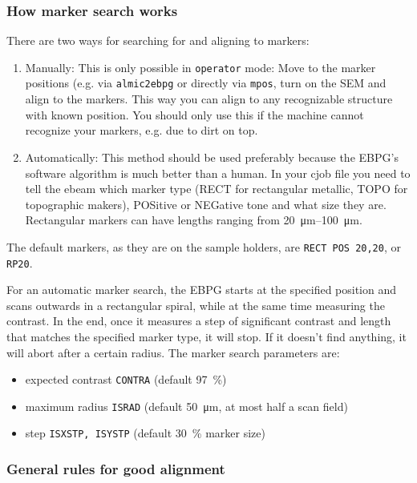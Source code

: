 \subsubsection{How marker search works}
There are two ways for searching for and aligning to markers:
\begin{enumerate}
	\item Manually: 
	This is only possible in \lstinline|operator| mode: 
	Move to the marker positions (e.g. via \lstinline|almic2ebpg| or directly via \lstinline|mpos|, turn on the SEM and align to the markers. 
	This way you can align to any recognizable structure with known position. 
	You should only use this if the machine cannot recognize your markers, e.g. due to dirt on top.
	\item Automatically: 
	This method should be used preferably because the EBPG's software algorithm is much better than a human.
	In your cjob file you need to tell the ebeam which marker type (RECT for rectangular metallic, TOPO for topographic makers), POSitive or NEGative tone and what size they are. 
	Rectangular markers can have lengths ranging from \SIrange{20}{100}{\micro\meter}.
\end{enumerate}

The default markers, as they are on the sample holders, are \lstinline|RECT POS 20,20|, or \lstinline|RP20|.
%

For an automatic marker search, the EBPG starts at the specified position and scans outwards in a rectangular spiral, while at the same time measuring the contrast. 
%
In the end, once it measures a step of significant contrast and length that matches the specified marker type, it will stop. 
%
If it doesn't find anything, it will abort after a certain radius.
%
The marker search parameters are:
\begin{itemize}
	\item expected contrast \lstinline|CONTRA| (default \SI{97}{\percent})
	\item maximum radius \lstinline|ISRAD| (default \SI{50}{\micro\meter}, at most half a scan field)
	\item step \lstinline|ISXSTP, ISYSTP| (default \SI{30}{\percent} marker size)
\end{itemize}
 
\subsubsection{General rules for good alignment}

